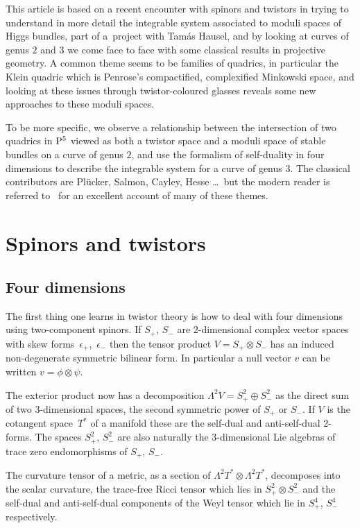 \documentclass[pdftex]{sigma}
\numberwithin{equation}{section}
\begin{document}
This article is based on a recent encounter with spinors and twistors in trying to understand in more detail the integrable system associated to moduli spaces of Higgs bundles, part of a~project with Tam\'as Hausel, and by looking at curves of genus $2$ and $3$ we come face to face with some classical results in projective geometry. A common theme seems to be families of quadrics, in particular the Klein quadric which is Penrose's compactified, complexified Minkowski space, and looking at these issues through twistor-coloured glasses reveals some new approaches to these moduli spaces.

To be more specific, we observe a relationship between the intersection of two quadrics in ${\rm P}^5$ viewed as both a twistor space and a moduli space of stable bundles on a curve of genus $2$, and use the formalism of self-duality in four dimensions to describe the integrable system for a curve of genus $3$.
The classical contributors are Pl\"ucker, Salmon, Cayley, Hesse \dots\ but the modern reader is referred to~\cite{Dolgachev} for an excellent account of many of these themes.

\section{Spinors and twistors}
\subsection{Four dimensions}\label{four}
The first thing one learns in twistor theory is how to deal with four dimensions using two-component spinors. If $S_+$, $S_-$ are $2$-dimensional complex vector spaces with skew forms~$\epsilon_+$,~$\epsilon_-$ then the tensor product $V=S_+\otimes S_-$ has an induced non-degenerate symmetric bilinear form. In particular a null vector $v$ can be written $v=\phi\otimes \psi$.

The exterior product now has a decomposition
$\Lambda^2V=S_+^2\oplus S_-^2$ as the direct sum of two $3$-dimensional spaces, the second symmetric power of $S_+$ or $S_-$. If $V$ is the cotangent space~$T^*$ of a manifold these are the self-dual and anti-self-dual $2$-forms. The spaces $S^2_+$, $S^2_-$ are also naturally the $3$-dimensional Lie algebras of trace zero endomorphisms of $S_+$, $S_-$.

The curvature tensor of a metric, as a section of $\Lambda^2T^*\otimes \Lambda^2T^*$, decomposes into the scalar curvature, the trace-free Ricci tensor which lies in $S^2_+\otimes S^2_-$ and the self-dual and anti-self-dual components of the Weyl tensor which lie in $S^4_+$, $S^4_-$ respectively.
\end{document}
